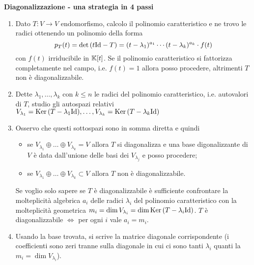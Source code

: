 \clearpage

\vspace{2mm}

\begin{framed}
	\begin{center}
		\textbf{Diagonalizzazione - una strategia in 4 passi}
	\end{center}
	\begin{enumerate}
		\item Dato $ T \colon V \to V $ endomorfismo, calcolo il polinomio caratteristico e ne trovo le radici ottenendo un polinomio della forma \[p_T(t) = \det{(t \mathrm{Id}- T)} = (t - \lambda_1)^{a_1} \cdots (t - \lambda_k)^{a_k} \cdot f(t)\] con $ f(t) $ irriducibile in $ \mathbb{K}[t] $. Se il polinomio caratteristico si fattorizza completamente nel campo, i.e. $ f(t) = 1 $ allora posso procedere, altrimenti $ T $ non è diagonalizzabile. 
		\item Dette $ \lambda_1, \ldots, \lambda_k $ con $ k \leq n $ le radici del polinomio caratteristico, i.e. autovalori di $ T $, studio gli autospazi relativi $ V_{\lambda_1} = \operatorname{Ker}{(T - \lambda_1 \mathrm{Id})}, \ldots, V_{\lambda_k} = \operatorname{Ker}{(T - \lambda_k \mathrm{Id})} $
		\item Osservo che questi sottospazi sono in somma diretta e quindi 
		\begin{itemize}
			\item se $ V_{\lambda_1} \oplus \ldots \oplus V_{\lambda_k} = V $ allora $ T $ si diagonalizza e una base digonalizzante di $ V $ è data dall'unione delle basi dei $ V_{\lambda_j} $ e posso procedere;
			\item se $ V_{\lambda_1} \oplus \ldots \oplus V_{\lambda_k} \subset V $ allora $ T $ non è diagonalizzabile.
		\end{itemize} 
		Se voglio solo sapere se $ T $ è diagonalizzabile è sufficiente confrontare la molteplicità algebrica $ a_i $ delle radici $ \lambda_i $ del polinomio caratteristico con la molteplicità geometrica $ m_i = \dim{V_{\lambda_i}} = \dim{\operatorname{Ker}{(T - \lambda_i \mathrm{Id})} }$. $ T $ è diagonalizzabile $ \iff $ per ogni $ i $ vale $ a_i = m_i $.
		\item Usando la base trovata, si scrive la matrice diagonale corrispondente (i coefficienti sono zeri tranne sulla diagonale in cui ci sono tanti $ \lambda_i $ quanti la $ m_i = \dim{V_{\lambda_i}} $). 
	\end{enumerate} 
\end{framed}